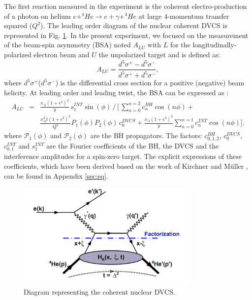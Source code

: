 \documentclass[aps,prc,preprint,superscriptaddress]{revtex4}
\begin{document}
The first reaction measured in the experiment is the coherent electro-production of a photon on helium
$e+^4\!\!He \rightarrow e+\gamma+^4\!\!He$ at large 4-momentum transfer squared ($Q^2$). The 
leading order diagram of the nuclear coherent DVCS is represented in Fig. \ref{fig:CohDiag}.
In the present experiment, we focused on the measurement of the beam-spin asymmetry (BSA) 
noted $A_{LU}$ with 
$L$ for the longitudinally-polarized electron beam and $U$ the unpolarized target and is defined as:  
\begin{equation}
A_{LU} = \frac{d^{5}\sigma^{+} - d^{5}\sigma^{-} }
              {d^{5}\sigma^{+} + d^{5}\sigma^{-}},
  \label{eq:BSA}
\end{equation}
where $d^{5}\sigma^{+}$($d^{5}\sigma^{-}$) is the differential cross section for a positive 
(negative) beam helicity. At leading order and leading twist, the BSA can be expressed as \cite{Kirchner:2003wt}:        
\begin{eqnarray}
\label{eq:coh_BSA}
A_{LU}& =& \frac{x_A(1+\epsilon^2)^2}{y} \, s_1^{INT} \sin(\phi) \, 
\bigg/ \, \bigg[ \, \sum_{n=0}^{n=2}c_n^{BH}\cos{(n\phi)} +  \\
& & \frac{x_A^2 t {(1+\epsilon^2)}^2}{Q^2} P_1(\phi) P_2(\phi) \, c_0^{DVCS} + 
\frac{x_A (1+\epsilon^2)^2}{y} \sum_{n=0}^{n=1} c_n^{INT} \cos{(n\phi)} \bigg].  \nonumber 
\end{eqnarray}
where $\mathcal{P}_1(\phi)$ and $\mathcal {P}_2(\phi)$ are the BH 
propagators. The factors: $c_{0,1,2}^{BH}$, $c_0^{DVCS}$, $c_{0,1}^{INT}$ and 
$s_1^{INT}$ are the Fourier coefficients of the BH, the DVCS and the 
interference amplitudes for a spin-zero target. The explicit 
expressions of these coefficients, which have been derived based on the work of 
Kirchner and Müller \cite{Kirchner:2003wt}, can be found in Appendix \ref{sec:eq}.

\begin{figure}[tbp!]
\center
\includegraphics[width=9cm]{fig3/DVCS_diagram.pdf}
\caption{Diagram representing the coherent nuclear DVCS.}
\label{fig:CohDiag}
\end{figure}
\end{document}
